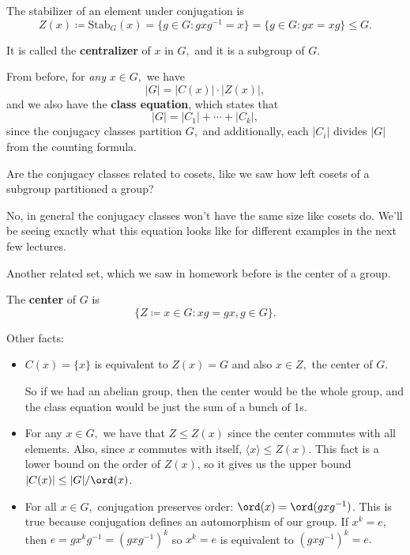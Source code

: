 \begin{definition}
The stabilizer of an element under conjugation is 
\[
Z(x) \coloneqq \text{Stab}_G(x) = \{g \in G: gxg^{-1}=x\} = \{g \in G: gx = xg\} \leq G.
\]

It is called the \textbf{centralizer} of $x$ in $G,$ and it is a subgroup of $G.$ 
\end{definition}

From before, for \emph{any} $x \in G,$
 we have 
 \[
 |G| = |C(x)| \cdot |Z(x)|,
 \]
 and we also have the \textbf{class equation}, which states that 
 \[
 |G| = |C_1| + \cdots + |C_k|,
 \]
 since the conjugacy classes partition $G,$ and additionally, each $|C_i|$ divides $|G|$ from the counting formula.
 \begin{question}
    Are the conjugacy classes related to cosets, like we saw how left cosets of a subgroup partitioned a group?
 \end{question}
 \begin{ans}
    No, in general the conjugacy classes won't have the same size like cosets do. 
    We'll be seeing exactly what this equation looks like for different examples in the next few lectures. 
 \end{ans}
 
 Another related set, which we saw in homework before is the center of a group. 
 \begin{definition}
 The \textbf{center} of $G$ is 
 \[
 \{Z \coloneqq x \in G: xg = gx, g \in G\}.
 \]
 \end{definition}
 
 Other facts: 
 \begin{itemize}
     \item $C(x) = \{x\}$ is equivalent to $Z(x) = G$ and also $x \in Z,$ the center of $G.$
     
     So if we had an abelian group, then the center would be the whole group, and the class equation would be just the sum of a bunch of 1s.
     \item For any $x \in G,$ we have that $Z \leq Z(x)$ since the center commutes with all elements. Also, since $x$ commutes with itself, $\langle x \rangle \leq Z(x).$ This fact is a lower bound on the order of $Z(x)$, so it gives us the upper bound $|C(x)| \leq |G|/\ord(x)$.
     
     \item For all $x \in G,$ conjugation preserves order: $\ord(x) = \ord(gxg^{-1})$. This is true because conjugation defines an automorphism of our group. If $x^k = e$, then $e = gx^kg^{-1} = (gxg^{-1})^k$ so $x^k = e$ is equivalent to $(gxg^{-1})^k = e.$
 \end{itemize}
 
